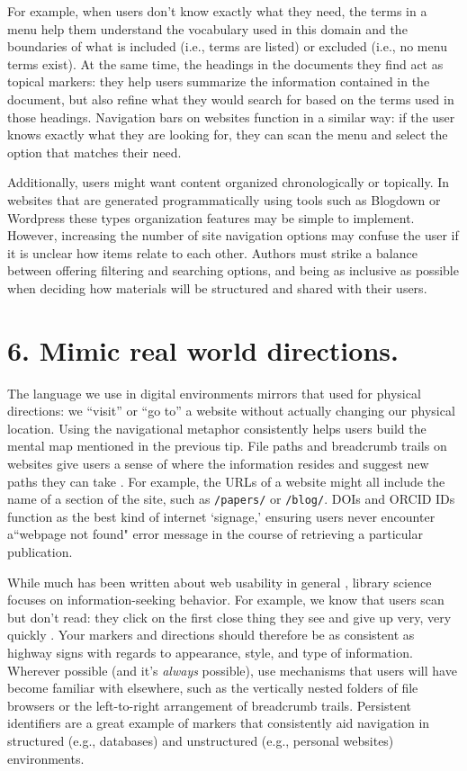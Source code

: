 \documentclass[10pt,letterpaper]{article}
\newcommand{\rulemajor}[1]{\section*{#1}}
\begin{document}
For example, when users don't know exactly what they need, the terms in a menu
help them understand the vocabulary used in this domain and the boundaries of
what is included (i.e., terms are listed) or excluded (i.e., no menu terms
exist). At the same time, the headings in the documents they find act as
topical markers: they help users summarize the information contained in the
document, but also refine what they would search for based on the terms used in
those headings. Navigation bars on websites function in a similar way: if the
user knows exactly what they are looking for, they can scan the menu and select
the option that matches their need.

Additionally, users might want content organized chronologically or topically.
In websites that are generated programmatically using tools such as
Blogdown\cite{Xie2017} or Wordpress \cite{Williams2015} these types organization
features may be simple to implement. However, increasing the number of site
navigation options may confuse the user if it is unclear how items relate to
each other. Authors must strike a balance between offering filtering and
searching options, and being as inclusive as possible when deciding how
materials will be structured and shared with their users.

\rulemajor{6. Mimic real world directions.}

The language we use in digital environments mirrors that used for physical
directions: we ``visit'' or ``go to'' a website without actually changing our
physical location. Using the navigational metaphor consistently helps users
build the mental map mentioned in the previous tip. File paths and breadcrumb
trails on websites give users a sense of where the information resides and
suggest new paths they can take \cite{Krug2014}. For example, the URLs of a
website might all include the name of a section of the site, such as
\texttt{/papers/} or \texttt{/blog/}. DOIs and ORCID IDs function as the best
kind of internet `signage,' ensuring users never encounter a``webpage not found"
error message in the course of retrieving a particular publication.

While much has been written about web usability in general
\cite{Covert2014,NNG2020}, library science focuses on information-seeking
behavior. For example, we know that users scan but don't read: they click on
the first close thing they see and give up very, very quickly \cite{Bates2002}.
Your markers and directions should therefore be as consistent as highway signs
with regards to appearance, style, and type of information. Wherever possible
(and it's \emph{always} possible), use mechanisms that users will have become
familiar with elsewhere, such as the vertically nested folders of file browsers
or the left-to-right arrangement of breadcrumb trails. Persistent identifiers
are a great example of markers that consistently aid navigation in structured
(e.g., databases) and unstructured (e.g., personal websites) environments.
\end{document}
